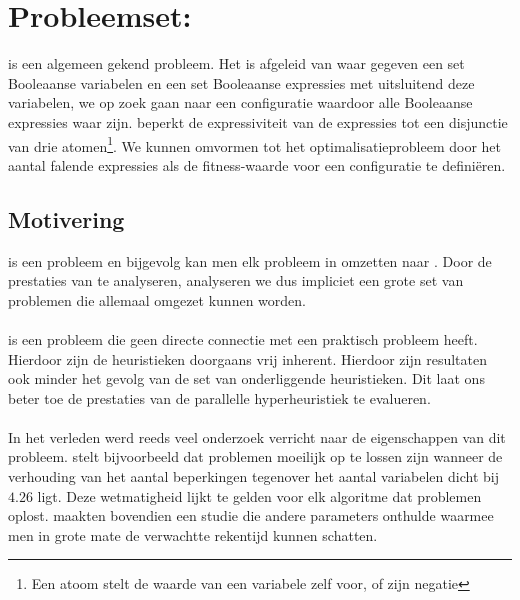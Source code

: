 \section{Probleemset: }

 is een algemeen gekend probleem. Het is afgeleid van  waar gegeven een set Booleaanse variabelen en een set Booleaanse expressies met uitsluitend deze variabelen, we op zoek gaan naar een configuratie waardoor alle Booleaanse expressies waar zijn.  beperkt de expressiviteit van de expressies tot een disjunctie van drie atomen\footnote{Een atoom stelt de waarde van een variabele zelf voor, of zijn negatie}. We kunnen  omvormen tot het optimalisatieprobleem  door het aantal falende expressies als de fitness-waarde voor een configuratie te defini\"eren.

\subsection{Motivering}

 is een  probleem en bijgevolg kan men elk probleem in  omzetten naar . Door de prestaties van  te analyseren, analyseren we dus impliciet een grote set van problemen die allemaal omgezet kunnen worden.

\paragraph{}
 is een probleem die geen directe connectie met een praktisch probleem heeft. Hierdoor zijn de heuristieken doorgaans vrij inherent. Hierdoor zijn resultaten ook minder het gevolg van de set van onderliggende heuristieken. Dit laat ons beter toe de prestaties van de parallelle hyperheuristiek te evalueren.

\paragraph{}
In het verleden werd reeds veel onderzoek verricht naar de eigenschappen van dit probleem. \cite{Selman96generatinghard} stelt bijvoorbeeld dat  problemen moeilijk op te lossen zijn wanneer de verhouding van het aantal beperkingen tegenover het aantal variabelen dicht bij $4.26$ ligt. Deze wetmatigheid lijkt te gelden voor elk algoritme dat  problemen oplost. \cite{Nudelman_understandingrandom} maakten bovendien een studie die andere parameters onthulde waarmee men in grote mate de verwachtte rekentijd kunnen schatten.

